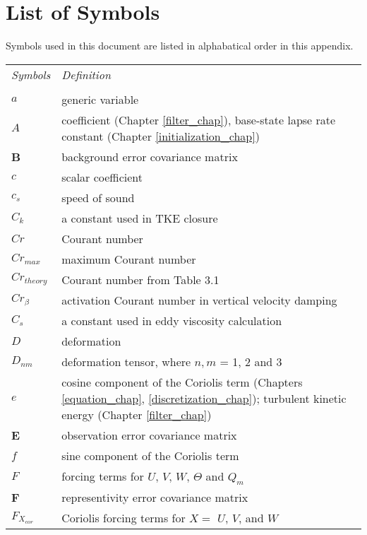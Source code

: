 \chapter{List of Symbols}
\label{List of Symbols}

Symbols used in this document are listed in alphabatical order in this appendix.
\\[2ex]

\begin{tabular}{ l p{5.5in} }

{\em Symbols}  & {\em Definition} \\   
\\
$a$            & generic variable \\ 
$A$            & coefficient (Chapter \ref{filter_chap}), base-state lapse rate constant (Chapter \ref{initialization_chap})  \\  
{\bf B}        & background error covariance matrix \\  
$c$            & scalar coefficient \\  
$c_s$          & speed of sound      \\  
$C_k$          & a constant used in TKE closure \\  
$Cr$           & Courant number      \\  
$Cr_{max}$     & maximum Courant number      \\  
$Cr_{theory}$  & Courant number from Table 3.1 \\  
$Cr_{\beta}$   & activation Courant number in vertical velocity damping \\  
$C_s$          & a constant used in eddy viscosity calculation \\  
$D$            & deformation \\
$D_{nm}$       & deformation tensor, where $n, m$ = 1, 2 and 3 \\  
$e$            & cosine component of the Coriolis term (Chapters \ref{equation_chap}, \ref{discretization_chap}); turbulent kinetic energy (Chapter \ref{filter_chap}) \\
{\bf E}        & observation error covariance matrix \\
$f$            & sine component of the Coriolis term \\
$F$            & forcing terms for $U$, $V$, $W$, $\Theta$ and $Q_m$  \\
{\bf F}        & representivity error covariance matrix \\
$F_{X_{cor}}$  & Coriolis forcing terms for $X = $ $U$, $V$, and $W$  \\

\end{tabular}
